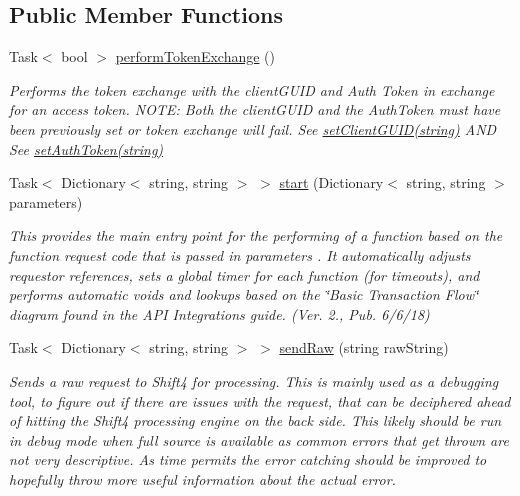 \subsection*{Public Member Functions}
\begin{DoxyCompactItemize}
\item 
Task$<$ bool $>$ \mbox{\hyperlink{interface_form_sim_1_1_f_r_c___handler_a32c299d3cb3cdd6c444e76b3671af1b4}{perform\+Token\+Exchange}} ()
\begin{DoxyCompactList}\small\item\em Performs the token exchange with the client\+G\+U\+ID and Auth Token in exchange for an access token. N\+O\+TE\+: Both the client\+G\+U\+ID and the Auth\+Token must have been previously set or token exchange will fail. See \mbox{\hyperlink{interface_form_sim_1_1_f_r_c___handler_a3c77b2e99c98553928e463a9cbb5f7d4}{set\+Client\+G\+U\+I\+D(string)}} A\+ND See \mbox{\hyperlink{interface_form_sim_1_1_f_r_c___handler_a1314ea0937067435e3326818baa9d0c1}{set\+Auth\+Token(string)}} \end{DoxyCompactList}\item 
Task$<$ Dictionary$<$ string, string $>$ $>$ \mbox{\hyperlink{interface_form_sim_1_1_f_r_c___handler_a2a2a8a776e774e5f8b5e2b7e623a26a6}{start}} (Dictionary$<$ string, string $>$ parameters)
\begin{DoxyCompactList}\small\item\em This provides the main entry point for the performing of a function based on the function request code that is passed in {\itshape parameters} . It automatically adjusts requestor references, sets a global timer for each function (for timeouts), and performs automatic voids and lookups based on the \char`\"{}\+Basic Transaction Flow\char`\"{} diagram found in the A\+PI Integrations guide. (Ver. 2., Pub. 6/6/18) \end{DoxyCompactList}\item 
Task$<$ Dictionary$<$ string, string $>$ $>$ \mbox{\hyperlink{interface_form_sim_1_1_f_r_c___handler_a1f855ed4026632d00ac5fc6784c3bf0f}{send\+Raw}} (string raw\+String)
\begin{DoxyCompactList}\small\item\em Sends a raw request to Shift4 for processing. This is mainly used as a debugging tool, to figure out if there are issues with the request, that can be deciphered ahead of hitting the Shift4 processing engine on the back side. This likely should be run in debug mode when full source is available as common errors that get thrown are not very descriptive. As time permits the error catching should be improved to hopefully throw more useful information about the actual error. \end{DoxyCompactList}\item 

\end{DoxyCompactItemize}
